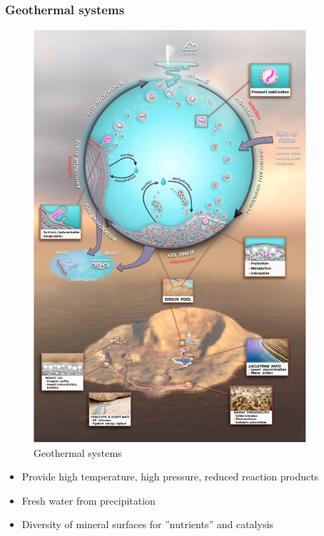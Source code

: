 \documentclass[]{article}
\begin{document}
  
\subsubsection{Geothermal systems}
\begin{figure}[h!]
	\caption{Geothermal systems \cite{damer2016field}}
	\includegraphics[width=0.9\textwidth]{GeothermalSystems}
\end{figure}

\begin{itemize}
	\item Provide high 	temperature, high
	pressure, reduced	reaction products
	\item Fresh water from 	precipitation
	\item Diversity of mineral	surfaces for ”nutrients” and catalysis
\end{itemize}
\end{document}
